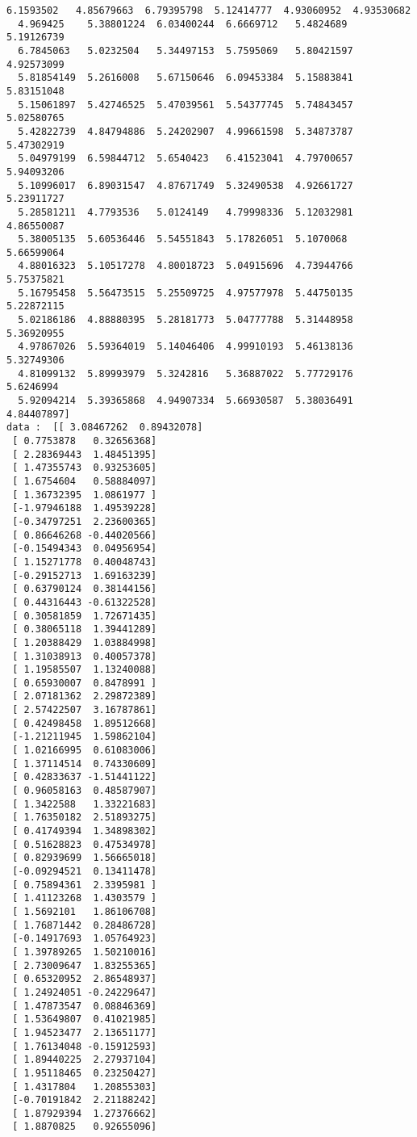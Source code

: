\documentclass[11pt]{article}
\begin{document}
\begin{Verbatim}[commandchars=\\\{\}]
  6.1593502   4.85679663  6.79395798  5.12414777  4.93060952  4.93530682
  4.969425    5.38801224  6.03400244  6.6669712   5.4824689   5.19126739
  6.7845063   5.0232504   5.34497153  5.7595069   5.80421597  4.92573099
  5.81854149  5.2616008   5.67150646  6.09453384  5.15883841  5.83151048
  5.15061897  5.42746525  5.47039561  5.54377745  5.74843457  5.02580765
  5.42822739  4.84794886  5.24202907  4.99661598  5.34873787  5.47302919
  5.04979199  6.59844712  5.6540423   6.41523041  4.79700657  5.94093206
  5.10996017  6.89031547  4.87671749  5.32490538  4.92661727  5.23911727
  5.28581211  4.7793536   5.0124149   4.79998336  5.12032981  4.86550087
  5.38005135  5.60536446  5.54551843  5.17826051  5.1070068   5.66599064
  4.88016323  5.10517278  4.80018723  5.04915696  4.73944766  5.75375821
  5.16795458  5.56473515  5.25509725  4.97577978  5.44750135  5.22872115
  5.02186186  4.88880395  5.28181773  5.04777788  5.31448958  5.36920955
  4.97867026  5.59364019  5.14046406  4.99910193  5.46138136  5.32749306
  4.81099132  5.89993979  5.3242816   5.36887022  5.77729176  5.6246994
  5.92094214  5.39365868  4.94907334  5.66930587  5.38036491  4.84407897] 
data :  [[ 3.08467262  0.89432078]
 [ 0.7753878   0.32656368]
 [ 2.28369443  1.48451395]
 [ 1.47355743  0.93253605]
 [ 1.6754604   0.58884097]
 [ 1.36732395  1.0861977 ]
 [-1.97946188  1.49539228]
 [-0.34797251  2.23600365]
 [ 0.86646268 -0.44020566]
 [-0.15494343  0.04956954]
 [ 1.15271778  0.40048743]
 [-0.29152713  1.69163239]
 [ 0.63790124  0.38144156]
 [ 0.44316443 -0.61322528]
 [ 0.30581859  1.72671435]
 [ 0.38065118  1.39441289]
 [ 1.20388429  1.03884998]
 [ 1.31038913  0.40057378]
 [ 1.19585507  1.13240088]
 [ 0.65930007  0.8478991 ]
 [ 2.07181362  2.29872389]
 [ 2.57422507  3.16787861]
 [ 0.42498458  1.89512668]
 [-1.21211945  1.59862104]
 [ 1.02166995  0.61083006]
 [ 1.37114514  0.74330609]
 [ 0.42833637 -1.51441122]
 [ 0.96058163  0.48587907]
 [ 1.3422588   1.33221683]
 [ 1.76350182  2.51893275]
 [ 0.41749394  1.34898302]
 [ 0.51628823  0.47534978]
 [ 0.82939699  1.56665018]
 [-0.09294521  0.13411478]
 [ 0.75894361  2.3395981 ]
 [ 1.41123268  1.4303579 ]
 [ 1.5692101   1.86106708]
 [ 1.76871442  0.28486728]
 [-0.14917693  1.05764923]
 [ 1.39789265  1.50210016]
 [ 2.73009647  1.83255365]
 [ 0.65320952  2.86548937]
 [ 1.24924051 -0.24229647]
 [ 1.47873547  0.08846369]
 [ 1.53649807  0.41021985]
 [ 1.94523477  2.13651177]
 [ 1.76134048 -0.15912593]
 [ 1.89440225  2.27937104]
 [ 1.95118465  0.23250427]
 [ 1.4317804   1.20855303]
 [-0.70191842  2.21188242]
 [ 1.87929394  1.27376662]
 [ 1.8870825   0.92655096]

\end{Verbatim}
\end{document}
